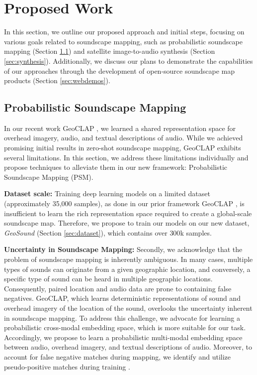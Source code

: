 %
%

\section{Proposed Work}
\label{sec:research}
In this section, we outline our proposed approach and initial steps, focusing on various goals related to soundscape mapping, such as probabilistic soundscape mapping (Section \ref{sec:psm}) and satellite image-to-audio synthesis (Section \ref{sec:synthesis}). Additionally, we discuss our plans to demonstrate the capabilities of our approaches through the development of open-source soundscape map products (Section \ref{sec:webdemos}).

\subsection{Probabilistic Soundscape Mapping}
\label{sec:psm}
In our recent work GeoCLAP \cite{khanal2023soundscape}, we learned a shared representation space for overhead imagery, audio, and textual descriptions of audio. While we achieved promising initial results in zero-shot soundscape mapping, GeoCLAP exhibits several limitations. In this section, we address these limitations individually and propose techniques to alleviate them in our new framework: Probabilistic Soundscape Mapping (PSM).

\textbf{Dataset scale:}
 Training deep learning models on a limited dataset (approximately 35,000 samples), as done in our prior framework GeoCLAP \cite{khanal2023soundscape}, is insufficient to learn the rich representation space required to create a global-scale soundscape map. Therefore, we propose to train our models on our new dataset, \textit{GeoSound} (Section \ref{sec:dataset}), which contains over $300$k samples.

\textbf{Uncertainty in Soundscape Mapping:}
Secondly, we acknowledge that the problem of soundscape mapping is inherently ambiguous. In many cases, multiple types of sounds can originate from a given geographic location, and conversely, a specific type of sound can be heard in multiple geographic locations. Consequently, paired location and audio data are prone to containing false negatives. GeoCLAP, which learns deterministic representations of sound and overhead imagery of the location of the sound, overlooks the uncertainty inherent in soundscape mapping. To address this challenge, we advocate for learning a probabilistic cross-modal embedding space, which is more suitable for our task. Accordingly, we propose to learn a probabilistic multi-modal embedding space \cite{chun2023improved} between audio, overhead imagery, and textual descriptions of audio. Moreover, to account for false negative matches during mapping, we identify and utilize pseudo-positive matches during training \cite{chun2023improved}.

